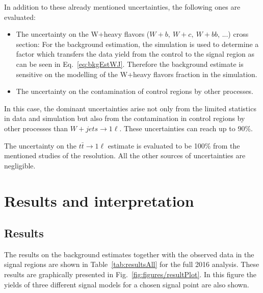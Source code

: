 In addition to these already mentioned uncertainties, the following ones are evaluated:
\begin{itemize} 
\item The uncertainty on the W+heavy flavors ($W+b,~W+c,~W+bb$, ...) cross section: For the background estimation, the simulation is used to determine a factor which transfers the data yield from the control to the signal region as can be seen in Eq.~\ref{eq:bkgEstWJ}. Therefore the background estimate is sensitive on the modelling of the W+heavy flavors fraction in the simulation.
\item The uncertainty on the contamination of control regions by other processes.
\end{itemize}

In this case, the dominant uncertainties arise not only from the limited statistics in data and simulation but also from the contamination in  control regions by other  processes than $W+jets \to 1\ell$. These uncertainties can reach up to 90\%.

The uncertainty on the $t\bar{t} \to 1\ell$ estimate is evaluated to be 100\% from the mentioned studies of the \MET resolution. All the other sources of uncertainties are negligible.



\section{Results and interpretation~\label{sec:results}}

\subsection{Results}

The results on the background estimates together with the observed data in the signal regions are shown in Table~\ref{tab:resultsAll} for the full 2016 analysis. These results are graphically presented in Fig.~\ref{fig:figures/resultPlot}. In this figure the yields of three different signal models for a chosen signal point are also shown. 

